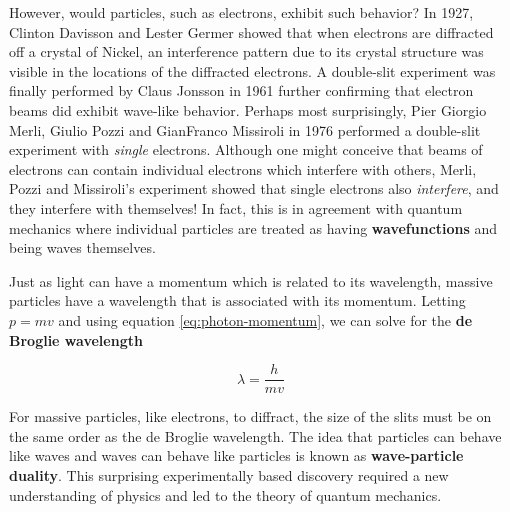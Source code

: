 However, would particles, such as electrons, exhibit such behavior? In 1927, Clinton Davisson and Lester Germer showed that when electrons are diffracted off a crystal of Nickel, an interference pattern due to its crystal structure was visible in the locations of the diffracted electrons. A double-slit experiment was finally performed by Claus Jonsson in 1961 further confirming that electron beams did exhibit wave-like behavior. Perhaps most surprisingly, Pier Giorgio Merli, Giulio Pozzi and GianFranco Missiroli in 1976 performed a double-slit experiment with \textit{single} electrons. Although one might conceive that beams of electrons can contain individual electrons which interfere with others, Merli, Pozzi and Missiroli's experiment showed that single electrons also \textit{interfere}, and they interfere with themselves! In fact, this is in agreement with quantum mechanics where individual particles are treated as having \textbf{wavefunctions} and being waves themselves. 

Just as light can have a momentum which is related to its wavelength, massive particles have a wavelength that is associated with its momentum. Letting $ p = mv $ and using equation \ref{eq:photon-momentum}, we can solve for the \textbf{de Broglie wavelength}

\begin{equation}
	\lambda = \frac{h}{mv}
\end{equation}

For massive particles, like electrons, to diffract, the size of the slits must be on the same order as the de Broglie wavelength. The idea that particles can behave like waves and waves can behave like particles is known as \textbf{wave-particle duality}. This surprising experimentally based discovery required a new understanding of physics and led to the theory of quantum mechanics. 

